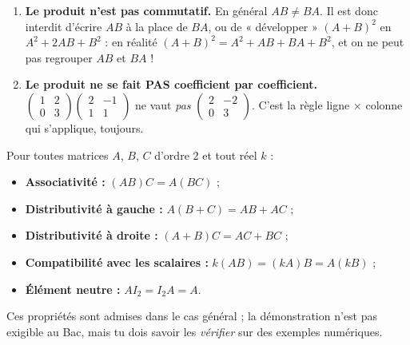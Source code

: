 \documentclass[11pt]{article}
\begin{document}
\begin{attention}
\begin{enumerate}
\item \textbf{Le produit n'est pas commutatif.} En général $AB \neq BA$. Il est donc interdit d'écrire $AB$ à la place de $BA$, ou de « développer » $(A+B)^2$ en $A^2 + 2AB + B^2$ : en réalité $(A+B)^2 = A^2 + AB + BA + B^2$, et on ne peut pas regrouper $AB$ et $BA$ !
\item \textbf{Le produit ne se fait PAS coefficient par coefficient.} $\begin{pmatrix} 1 & 2 \\ 0 & 3 \end{pmatrix}\begin{pmatrix} 2 & -1 \\ 1 & 1 \end{pmatrix}$ ne vaut \emph{pas} $\begin{pmatrix} 2 & -2 \\ 0 & 3 \end{pmatrix}$. C'est la règle ligne $\times$ colonne qui s'applique, toujours.
\end{enumerate}
\end{attention}

\begin{propriete}
Pour toutes matrices $A$, $B$, $C$ d'ordre 2 et tout réel $k$ :
\begin{itemize}
\item \textbf{Associativité :} $(AB)C = A(BC)$ ;
\item \textbf{Distributivité à gauche :} $A(B+C) = AB + AC$ ;
\item \textbf{Distributivité à droite :} $(A+B)C = AC + BC$ ;
\item \textbf{Compatibilité avec les scalaires :} $k(AB) = (kA)B = A(kB)$ ;
\item \textbf{Élément neutre :} $AI_2 = I_2A = A$.
\end{itemize}
Ces propriétés sont admises dans le cas général ; la démonstration n'est pas exigible au Bac, mais tu dois savoir les \emph{vérifier} sur des exemples numériques.
\end{propriete}
\end{document}
